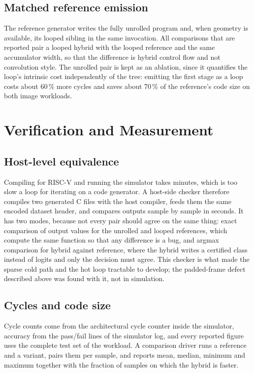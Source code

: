 \subsection{Matched reference emission}

The reference generator writes the fully unrolled program and, when geometry is available, its looped sibling in the same invocation.
All comparisons that are reported pair a looped hybrid with the looped reference and the same accumulator width, so that the difference is hybrid control flow and not convolution style.
The unrolled pair is kept as an ablation, since it quantifies the loop's intrinsic cost independently of the tree: emitting the first stage as a loop costs about 60\,\% more cycles and saves about 70\,\% of the reference's code size on both image workloads.


\section{Verification and Measurement}
\label{sec:impl-measure}

\subsection{Host-level equivalence}

Compiling for \mbox{RISC-V} and running the simulator takes minutes, which is too slow a loop for iterating on a code generator.
A host-side checker therefore compiles two generated C files with the host compiler, feeds them the same encoded dataset header, and compares outputs sample by sample in seconds.
It has two modes, because not every pair should agree on the same thing: exact comparison of output values for the unrolled and looped references, which compute the same function so that any difference is a bug, and argmax comparison for hybrid against reference, where the hybrid writes a certified class instead of logits and only the decision must agree.
This checker is what made the sparse cold path and the hot loop tractable to develop; the padded-frame defect described above was found with it, not in simulation.

\subsection{Cycles and code size}

Cycle counts come from the architectural cycle counter inside the simulator, accuracy from the pass/fail lines of the simulator log, and every reported figure uses the complete test set of the workload.
A comparison driver runs a reference and a variant, pairs them per sample, and reports mean, median, minimum and maximum together with the fraction of samples on which the hybrid is faster.

